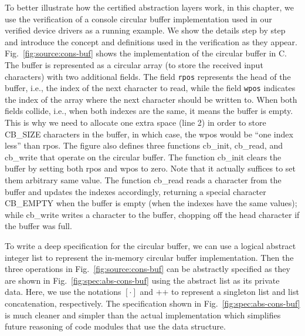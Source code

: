 

To better illustrate how the certified abstraction layers work,
in this chapter, we use the verification of a console
circular buffer implementation used in our verified device drivers
as a running example. We show the details step by step and introduce
the concept and definitions used in the verification as they appear.
Fig.~\ref{fig:source:cons-buf} shows the implementation of the circular
buffer in C. The buffer is represented as a circular array
(to store the received input characters) with two additional
fields. The field \texttt{rpos} represents the head of the buffer,
i.e., the index of the next character to read, while the field
\texttt{wpos} indicates the index of the array where the next character
should be written to. When both fields collide, i.e., when both
indexes are the same, it means the buffer is empty. This is why we need
to allocate one extra space (line 2) in order to store \textsf{CB\_SIZE}
characters in the buffer, in which case, the \textsf{wpos} would be
``one index less'' than \textsf{rpos}. 
The figure also defines three functions
\textsf{cb\_init}, \textsf{cb\_read}, and \textsf{cb\_write} that operate
on the circular buffer. The function \textsf{cb\_init} clears the buffer
by setting both \textsf{rpos} and \textsf{wpos} to zero. Note that
it actually suffices to set them arbitrary same value. The function
\textsf{cb\_read} reads a character from the buffer and updates the
indexes accordingly, returning a special character \textsf{CB\_EMPTY}
when the buffer is empty (when the indexes have the same values);
while \textsf{cb\_write} writes a character to the buffer, chopping
off the head character if the buffer was full.

To write a deep specification for the circular buffer, we can use a logical
abstract integer list to represent the in-memory circular buffer implementation.
Then the three operations in Fig.~\ref{fig:source:cons-buf} can be
abstractly specified as they are shown in Fig.~\ref{fig:spec:abs-cons-buf}
using the abstract list as its private data. Here, we use the
notations $[\cdot]$ and $\textsf{++}$ to represent a singleton list and list
concatenation, respectively. The specification shown in
Fig.~\ref{fig:spec:abs-cons-buf} is much cleaner and simpler than the actual
implementation which simplifies future reasoning of code modules that use the
data structure.


